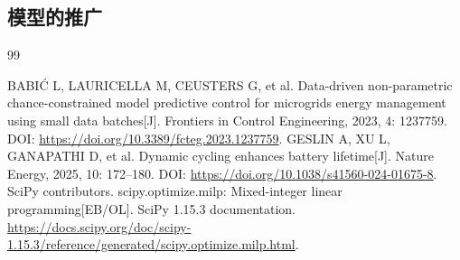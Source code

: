\documentclass[withoutpreface,bwprint]{cumcmthesis}
\begin{document}
\subsection{模型的推广}






































\newpage
\begin{thebibliography}{99}
\raggedright
{}
BABIĆ L, LAURICELLA M, CEUSTERS G, et al.
Data-driven non-parametric chance-constrained model predictive control for microgrids energy management using small data batches[J].
Frontiers in Control Engineering, 2023, 4: 1237759.
DOI: \url{https://doi.org/10.3389/fcteg.2023.1237759}.
GESLIN A, XU L, GANAPATHI D, et al.
Dynamic cycling enhances battery lifetime[J].
Nature Energy, 2025, 10: 172--180.
DOI: \url{https://doi.org/10.1038/s41560-024-01675-8}.
SciPy contributors. scipy.optimize.milp: Mixed-integer linear programming[EB/OL].
SciPy 1.15.3 documentation.
\url{https://docs.scipy.org/doc/scipy-1.15.3/reference/generated/scipy.optimize.milp.html}.
\end{thebibliography}
\end{document}
